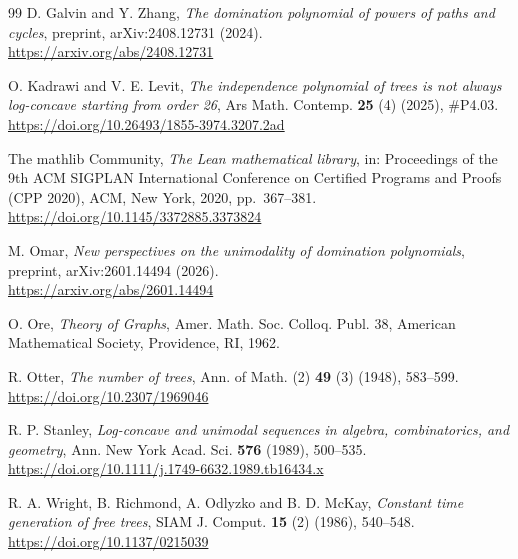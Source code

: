 \documentclass[11pt,a4paper]{article}
\theoremstyle{definition}
\begin{document}
\begin{thebibliography}{99}
 D. Galvin and Y. Zhang,
{\it The domination polynomial of powers of paths and cycles},
preprint, arXiv:2408.12731 (2024).
\\ {\tiny \url{https://arxiv.org/abs/2408.12731} }

 O. Kadrawi and V. E. Levit,
{\it The independence polynomial of trees is not always log-concave starting from order 26},
Ars Math. Contemp. {\bf 25} (4) (2025), \#P4.03.
\\ {\tiny \url{https://doi.org/10.26493/1855-3974.3207.2ad} }

 The mathlib Community,
{\it The Lean mathematical library},
in: Proceedings of the 9th ACM SIGPLAN International Conference on Certified Programs and Proofs (CPP 2020), ACM, New York, 2020, pp.~367--381.
\\ {\tiny \url{https://doi.org/10.1145/3372885.3373824} }

 M. Omar,
{\it New perspectives on the unimodality of domination polynomials},
preprint, arXiv:2601.14494 (2026).
\\ {\tiny \url{https://arxiv.org/abs/2601.14494} }

 O. Ore,
{\it Theory of Graphs},
Amer. Math. Soc. Colloq. Publ. 38, American Mathematical Society, Providence, RI, 1962.

 R. Otter,
{\it The number of trees},
Ann. of Math. (2) {\bf 49} (3) (1948), 583--599.
\\ {\tiny \url{https://doi.org/10.2307/1969046} }

 R. P. Stanley,
{\it Log-concave and unimodal sequences in algebra, combinatorics, and geometry},
Ann. New York Acad. Sci. {\bf 576} (1989), 500--535.
\\ {\tiny \url{https://doi.org/10.1111/j.1749-6632.1989.tb16434.x} }

 R. A. Wright, B. Richmond, A. Odlyzko and B. D. McKay,
{\it Constant time generation of free trees},
SIAM J. Comput. {\bf 15} (2) (1986), 540--548.
\\ {\tiny \url{https://doi.org/10.1137/0215039} }

\end{thebibliography}
\end{document}
